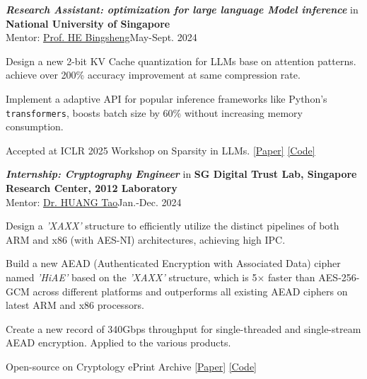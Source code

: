 \documentclass[10pt]{article}
\newenvironment{outerlist}[1][\enskip\textbullet]%
        {%
        \begin{itemize}[label=#1, itemsep=1pt]}{\end{itemize}%
         \vspace{-0.6\baselineskip}}
\newenvironment{innerlist}[1][\enskip$\circ$]%
        {\begin{compactitem}[#1]}{\end{compactitem}}
\begin{document}
\begin{outerlist}
\item {\it\textbf{Research Assistant: optimization for large language Model inference}} in \textbf{National University of Singapore}\\
Mentor: \href{https://www.comp.nus.edu.sg/~hebs/}{Prof. HE Bingsheng}\hfill May-Sept.  2024\\
\vspace{-0.2in}
\begin{innerlist}
        \item Design a new 2-bit KV Cache quantization for LLMs base on attention patterns. achieve over 200\% accuracy improvement at same compression rate.
        \item Implement a adaptive API for popular inference frameworks like Python’s \texttt{transformers}, boosts batch size by 60\% without increasing memory consumption.
        \item Accepted at ICLR 2025 Workshop on Sparsity in LLMs. \space \href{https://www.researchgate.net/publication/388733634_LogQuant_Log-Distributed_2-Bit_Quantization_of_KV_Cache_with_Superior_Accuracy_Preservation}{[Paper]} \space \href{https://github.com/Concyclics/LogQuantKV}{[Code]}
\end{innerlist}

\item {\it\textbf{Internship: Cryptography Engineer}} in \textbf{SG Digital Trust Lab, Singapore Research Center, 2012 Laboratory}\\
Mentor: \href{mailto:huangtao80@huawei.com}{Dr. HUANG Tao}\hfill Jan.-Dec.  2024\\
\vspace{-0.2in}
\begin{innerlist}
        \item Design a \textit{'XAXX'} structure to efficiently utilize the distinct pipelines of both ARM and x86 (with AES-NI) architectures, achieving high IPC.
        \item Build a new AEAD (Authenticated Encryption with Associated Data) cipher named \textit{'HiAE'} based on the \textit{'XAXX'} structure, which is 5$\times$ faster than AES-256-GCM across different platforms and outperforms all existing AEAD ciphers on latest ARM and x86 processors.
        \item Create a new record of 340Gbps throughput for single-threaded and single-stream AEAD encryption. Applied to the various products.
        \item Open-source on Cryptology ePrint Archive \space \href{https://eprint.iacr.org/2025/377}{[Paper]} \space \href{https://github.com/Concyclics/HiAE}{[Code]}
\end{innerlist}


\end{outerlist}
\end{document}
